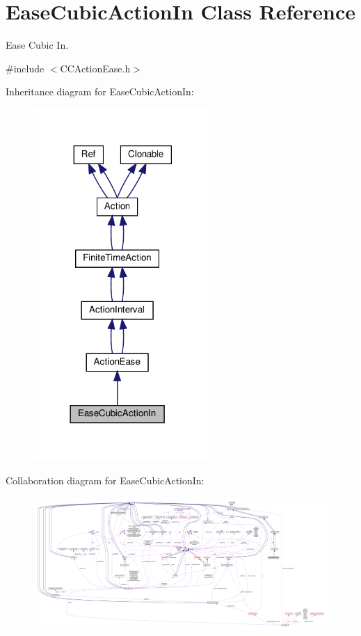 \hypertarget{classEaseCubicActionIn}{}\section{Ease\+Cubic\+Action\+In Class Reference}
\label{classEaseCubicActionIn}


Ease Cubic In.  




{\ttfamily \#include $<$C\+C\+Action\+Ease.\+h$>$}



Inheritance diagram for Ease\+Cubic\+Action\+In\+:
\nopagebreak
\begin{figure}[H]
\begin{center}
\leavevmode
\includegraphics[width=189pt]{classEaseCubicActionIn__inherit__graph}
\end{center}
\end{figure}


Collaboration diagram for Ease\+Cubic\+Action\+In\+:
\nopagebreak
\begin{figure}[H]
\begin{center}
\leavevmode
\includegraphics[width=350pt]{classEaseCubicActionIn__coll__graph}
\end{center}
\end{figure}
